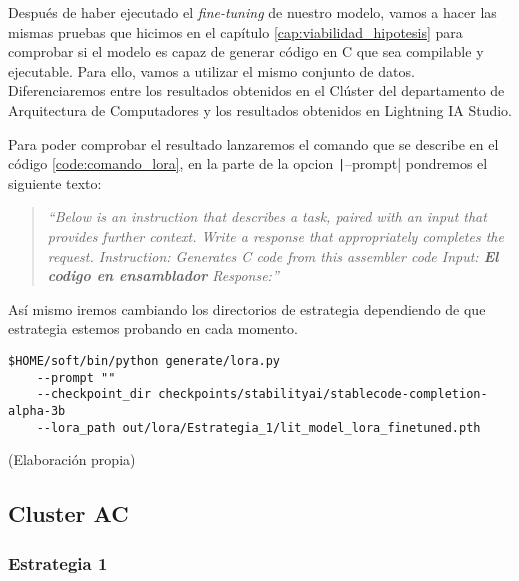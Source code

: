 
Después de haber ejecutado el \textit{fine-tuning} de nuestro modelo, vamos a hacer las mismas pruebas
que hicimos en el capítulo \ref{cap:viabilidad_hipotesis} para comprobar si el modelo es capaz de
generar código en C que sea compilable y ejecutable. Para ello, vamos a utilizar el mismo conjunto
de datos. Diferenciaremos entre los resultados obtenidos en el Clúster del departamento de Arquitectura
de Computadores y los resultados obtenidos en Lightning IA Studio.

Para poder comprobar el resultado lanzaremos el comando que se describe en el código \ref{code:comando_lora},
en la parte de la opcion \texttt|--prompt| pondremos el siguiente texto:

\begin{quote}
    \textit{``Below is an instruction that describes a task, paired with an input that provides further context.
    Write a response that appropriately completes the request. \newline
    Instruction: Generates C code from this assembler code \newline
    Input: \textbf{El codigo en ensamblador}\newline
    Response:''}
\end{quote}

Así mismo iremos cambiando los directorios de estrategia dependiendo de que estrategia estemos probando
en cada momento.

\begin{mycode}
    \begin{verbatim}
$HOME/soft/bin/python generate/lora.py 
    --prompt "" 
    --checkpoint_dir checkpoints/stabilityai/stablecode-completion-alpha-3b 
    --lora_path out/lora/Estrategia_1/lit_model_lora_finetuned.pth 
    \end{verbatim}
    \caption[]{ (Elaboración propia)}
    \label{code:comando_lora}
\end{mycode}

\subsection{Cluster AC}
\label{subsec:cluster_ac}

\subsubsection{Estrategia 1}
\label{subsubsec:resultados:estrategia_1}


